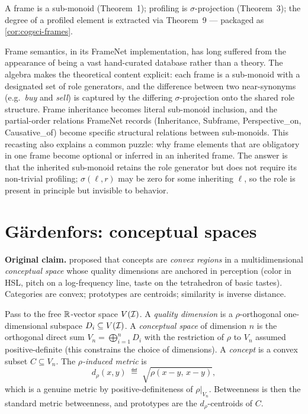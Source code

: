 \formalstatus A frame is a sub-monoid (Theorem~1); profiling is
$\sigma$-projection (Theorem~3); the degree of a profiled element is
extracted via Theorem~9 --- packaged as \cref{cor:cogsci-frames}.

\litcomment Frame semantics, in its FrameNet implementation, has long
suffered from the appearance of being a vast hand-curated database
rather than a theory. The algebra makes the theoretical content explicit:
each frame is a sub-monoid with a designated set of role generators, and
the difference between two near-synonyms (e.g.\ \emph{buy} and
\emph{sell}) is captured by the differing $\sigma$-projection onto the
shared role structure. Frame inheritance becomes literal sub-monoid
inclusion, and the partial-order relations FrameNet records (Inheritance,
Subframe, Perspective\_on, Causative\_of) become specific structural
relations between sub-monoids. This recasting also explains a common
puzzle: why frame elements that are obligatory in one frame become
optional or inferred in an inherited frame. The answer is that the
inherited sub-monoid retains the role generator but does not require its
non-trivial profiling; $\sigma(\ell,r)$ may be zero for some inheriting
$\ell$, so the role is present in principle but invisible to behavior.

\section{G\"ardenfors: conceptual spaces}\label{sec:cogsci-gardenfors}

\textbf{Original claim.} \citet{Gardenfors2000} proposed that concepts are
\emph{convex regions} in a multidimensional \emph{conceptual space} whose
quality dimensions are anchored in perception (color in HSL, pitch on a
log-frequency line, taste on the tetrahedron of basic tastes). Categories
are convex; prototypes are centroids; similarity is inverse distance.

\formalclaim Pass to the free $\mathbb{R}$-vector space $V(\mathcal{I})$. A
\emph{quality dimension} is a $\rho$-orthogonal one-dimensional subspace
$D_i\subseteq V(\mathcal{I})$. A \emph{conceptual space} of dimension $n$ is
the orthogonal direct sum $V_n=\bigoplus_{i=1}^{n}D_i$ with the
restriction of $\rho$ to $V_n$ assumed positive-definite (this constrains
the choice of dimensions). A \emph{concept} is a convex subset
$C\subseteq V_n$. The \emph{$\rho$-induced metric} is
\[
  d_\rho(x,y)\;\eqdef\;\sqrt{\rho(x-y,\,x-y)},
\]
which is a genuine metric by positive-definiteness of $\rho|_{V_n}$.
Betweenness is then the standard metric betweenness, and prototypes are
the $d_\rho$-centroids of $C$.

